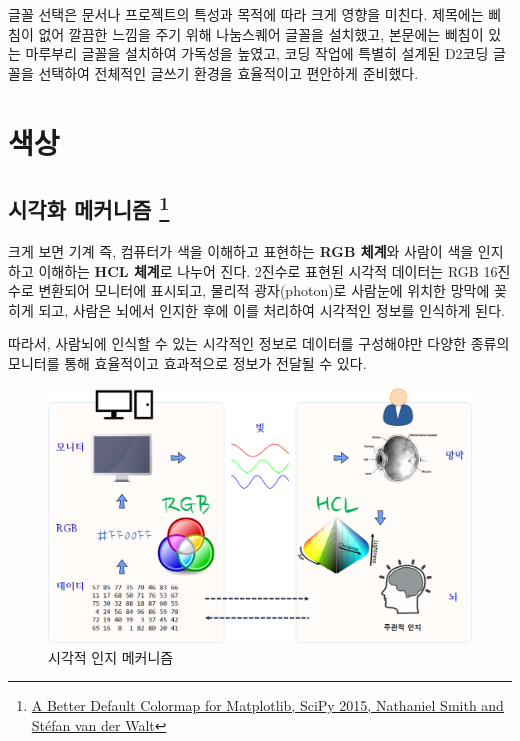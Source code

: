 \documentclass[
  letterpaper,
]{book}
\begin{document}
글꼴 선택은 문서나 프로젝트의 특성과 목적에 따라 크게 영향을 미친다.
제목에는 삐침이 없어 깔끔한 느낌을 주기 위해 나눔스퀘어 글꼴을 설치했고,
본문에는 삐침이 있는 마루부리 글꼴을 설치하여 가독성을 높였고, 코딩
작업에 특별히 설계된 D2코딩 글꼴을 선택하여 전체적인 글쓰기 환경을
효율적이고 편안하게 준비했다.

\hypertarget{uxc0c9uxc0c1}{%
\chapter{색상}\label{uxc0c9uxc0c1}}

\hypertarget{color-mechanism}{%
\section[시각화 메커니즘 ]{\texorpdfstring{시각화 메커니즘
\footnote{\href{https://www.youtube.com/watch?v=xAoljeRJ3lU&feature=youtu.be}{A
  Better Default Colormap for Matplotlib, SciPy 2015, Nathaniel Smith
  and Stéfan van der Walt}}}{시각화 메커니즘 }}\label{color-mechanism}}

크게 보면 기계 즉, 컴퓨터가 색을 이해하고 표현하는 \textbf{RGB 체계}와
사람이 색을 인지하고 이해하는 \textbf{HCL 체계}로 나누어 진다. 2진수로
표현된 시각적 데이터는 RGB 16진수로 변환되어 모니터에 표시되고, 물리적
광자(photon)로 사람눈에 위치한 망막에 꽂히게 되고, 사람은 뇌에서 인지한
후에 이를 처리하여 시각적인 정보를 인식하게 된다.

따라서, 사람뇌에 인식할 수 있는 시각적인 정보로 데이터를 구성해야만
다양한 종류의 모니터를 통해 효율적이고 효과적으로 정보가 전달될 수 있다.

\begin{figure}

{\centering \includegraphics[width=1\textwidth,height=\textheight]{images/color-viz-mechanism.png}

}

\caption{시각적 인지 메커니즘}

\end{figure}
\end{document}
